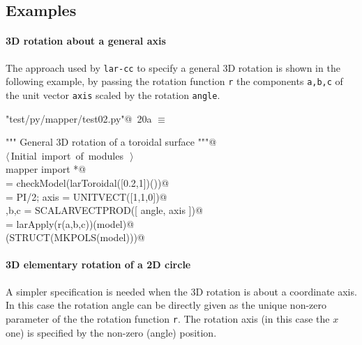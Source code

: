 \documentclass[11pt,oneside]{article}	%
\begin{document}
\subsection{Examples}

\paragraph{3D rotation about a general axis}
The approach used by \texttt{lar-cc} to specify a general 3D rotation is shown in the following example,
by passing the rotation function \texttt{r} the components \texttt{a,b,c} of the unit vector \texttt{axis} scaled by the rotation \texttt{angle}. 

\begin{flushleft} \small \label{scrap37}
\protect{}\verb@"test/py/mapper/test02.py"@\nobreak\ {\footnotesize 20a }$\equiv$
\vspace{-1ex}
\begin{list}{}{} \item
\mbox{}\verb@""" General 3D rotation of a toroidal surface """@\\
\mbox{}\verb@@\hbox{$\langle\,$Initial import of modules\nobreak\ {\footnotesize {}}$\,\rangle$}\verb@@\\
\mbox{}\verb@from mapper import *@\\
\mbox{}\verb@model = checkModel(larToroidal([0.2,1])())@\\
\mbox{}\verb@angle = PI/2; axis = UNITVECT([1,1,0])@\\
\mbox{}\verb@a,b,c = SCALARVECTPROD([ angle, axis ])@\\
\mbox{}\verb@model = larApply(r(a,b,c))(model)@\\
\mbox{}\verb@VIEW(STRUCT(MKPOLS(model)))@\\
\mbox{}\verb@@{\NWsep}
\end{list}
\vspace{-2ex}
\end{flushleft}


\paragraph{3D elementary rotation of a 2D circle}
A simpler specification is needed when the 3D rotation is about a coordinate axis. In this case the rotation angle can be directly given as the unique non-zero parameter of the the rotation function \texttt{r}. The rotation axis (in this case the $x$ one) is specified by the non-zero (angle) position.
\end{document}
